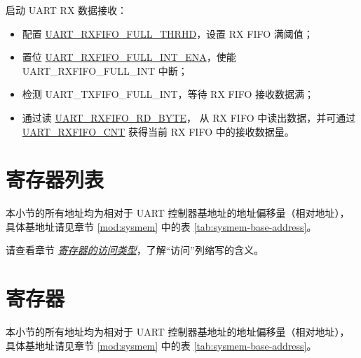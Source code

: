 \documentclass[main\_\_CN.tex]{subfiles}
\begin{document}
启动 UART RX 数据接收：
\begin{itemize}
    \item 配置 \hyperref[fielddesc:UARTRXFIFOFULLTHRHD]{UART\_RXFIFO\_FULL\_THRHD}，设置 RX FIFO 满阈值；
    \item 置位 \hyperref[fielddesc:UARTRXFIFOFULLINTENA]{UART\_RXFIFO\_FULL\_INT\_ENA}，使能 UART\_RXFIFO\_FULL\_INT 中断；
    \item 检测 UART\_TXFIFO\_FULL\_INT，等待 RX FIFO 接收数据满；
    \item 通过读 \hyperref[fielddesc:UARTRXFIFORDBYTE]{UART\_RXFIFO\_RD\_BYTE}， 从 RX FIFO 中读出数据，并可通过 \hyperref[fielddesc:UARTRXFIFOCNT]{UART\_RXFIFO\_CNT} 获得当前 RX FIFO 中的接收数据量。
\end{itemize}



\clearpage
\section{寄存器列表}
\label{sec:uart-reg-summ}
\hypertarget{uart-reg-summ}{}

本小节的所有地址均为相对于 UART 控制器基地址的地址偏移量（相对地址），具体基地址请见章节 \ref{mod:sysmem} \textit{} 中的表 \ref{tab:sysmem-base-address}。

请查看章节 \hyperref[glossary-access-types]{\textit{寄存器的访问类型}}，了解“访问”列缩写的含义。





\clearpage
\section{寄存器}

本小节的所有地址均为相对于 UART 控制器基地址的地址偏移量（相对地址），具体基地址请见章节 \ref{mod:sysmem} \textit{} 中的表 \ref{tab:sysmem-base-address}。



\end{document}
